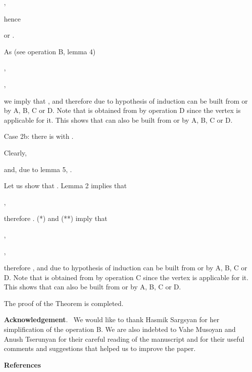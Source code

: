 \documentclass{article}
\begin{document}
\begin{center}
,
\end{center}

hence

\begin{center}
 or .
\end{center}

As (see operation B, lemma 4)

\begin{center}
,

,
\end{center}

we imply that , and therefore due to hypothesis of induction  can be built from  or  by
A, B, C or D. Note that  is obtained from  by operation D since the vertex  is applicable for
it. This shows that  can also be built from  or  by A, B, C
or D.

Case 2b: there is  with .

Clearly,

\begin{center}
 and, due to lemma 5, .
\end{center}

Let us show that . Lemma 2 implies that

\begin{center}
,
\end{center}

therefore . (*) and (**) imply that

\begin{center}
,

,
\end{center}

therefore , and due to hypothesis of induction  can be built from  or  by A, B, C or D.
Note that  is obtained from  by
operation C since the vertex  is applicable for it. This shows that 
can also be built from  or  by A, B, C or D.

The proof of the Theorem is completed.

\bigskip

\textbf{Acknowledgement}. \ We would like to thank Hasmik Sargsyan for her
simplification of the operation B. We are also indebted to Vahe Musoyan and
Anush Tserunyan for their careful reading of the manuscript and for their
useful comments and suggestions that helped us to improve the paper.

\bigskip

\begin{center}
\textbf{References}\bigskip
\end{center}
\end{document}
